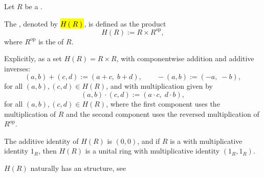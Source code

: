 \begin{definition} \label{definition:hyperbolic_ring_of_a_ring}
    Let $R$ be a .

    The , denoted by \hl{$H(R)$}, is defined as the product
    $$ H(R) := R \times R^{\mathrm{op}}, $$
    where $R^{\mathrm{op}}$ is the  of $R$.

    Explicitly, as a set $H(R) = R \times R$, with componentwise addition and additive inverses:
    $$ (a,b) + (c,d) := (a+c,\; b+d), \qquad -(a,b) := (-a,\; -b), $$
    for all $(a,b), (c,d) \in H(R)$, and with multiplication given by
    $$ (a,b) \cdot (c,d) := (a \cdot c,\; d \cdot b), $$
    for all $(a,b), (c,d) \in H(R)$, where the first component uses the multiplication of $R$ and the second component uses the reversed multiplication of $R^{\mathrm{op}}$.

    The additive identity of $H(R)$ is $(0,0)$, and if $R$ is a  with multiplicative identity $1_R$, then $H(R)$ is a unital ring with multiplicative identity $(1_R, 1_R)$.

    $H(R)$ naturally has an  structure, see 
\end{definition}
